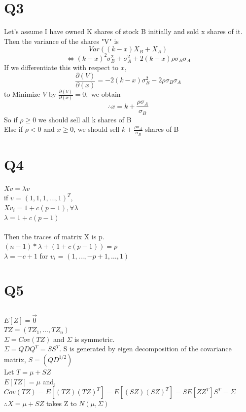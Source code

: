 \documentclass{article}
\begin{document}
\section{Q3}
Let's assume I have owned K shares of stock B initially and sold x shares of it.\\
Then the variance of the shares "V" is\\
\[Var( (k-x) X_{B} + X_{A}) \]
\[\iff (k-x)^{2} \sigma^{2}_{B} + \sigma^{2}_{A} + 2 (k-x) \rho \sigma_{B} \sigma_{A} \]
If we differentiate this with respect to $x$,\\
\[ \frac{\partial(V)}{\partial(x)} = -2(k-x)\sigma^{2}_{B} - 2\rho \sigma_{B} \sigma_{A} \]
to Minimize $V$ by $\frac{\partial(V)}{\partial(x)} =0,$ we obtain\\
\[\therefore x = k + \frac{\rho \sigma_{A}}{\sigma_{B}}\]
So if $\rho \geq 0$ we should sell all k shares of B\\
Else if $\rho < 0$ and $x \geq 0$, we should sell $ k + \frac{\rho \sigma_{A}}{\sigma_{B}}$ shares of B

\section{Q4}
$Xv = \lambda v$\\
if $v$ = $(1,1,1,\dots,1)^{T}$,\\
$Xv_{i} = 1+c(p-1), \forall \lambda$\\
$\lambda = 1+c(p-1)$\\
\\
Then the traces of matrix X is p.\\
$ (n-1) * \lambda + (1+c(p-1)) = p $\\
$\lambda = -c + 1$ for $v_{i}$ = $(1,\dots,-p+1,\dots,1)$

\section{Q5}
\subsection{}
$E[Z] = \Vec{0}$\\
$TZ = (TZ_{1}, \dots, TZ_{n})$\\
$\Sigma = Cov(TZ)$ and $\Sigma$ is symmetric.\\ $\Sigma = QDQ^{T} = SS^{T}$. S is generated by eigen decomposition of the covariance matrix, $S = (QD^{1/2})$\\
Let $T = \mu + SZ$\\
$E[TZ] = \mu$ and,
$Cov(TZ) = E[(TZ)(TZ)^{T}] = E[(SZ)(SZ)^{T}] = SE[ZZ^{T}]S^T = \Sigma$\\
$\therefore X = \mu + SZ$ takes Z to $N(\mu,\Sigma)$
\end{document}
